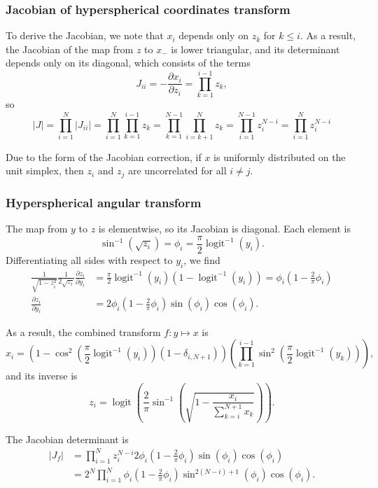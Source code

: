 \begin{appendices}
\subsubsection{Jacobian of hyperspherical coordinates transform}

To derive the Jacobian, we note that $x_i$ depends only on $z_k$ for $k \le i$.
As a result, the Jacobian of the map from $z$ to $x_-$ is lower triangular, and its determinant depends only on its diagonal, which consists of the terms
$$J_{ii} = -\frac{\partial x_i}{\partial z_i} = \prod_{k=1}^{i-1} z_k,$$
so
$$
|J| = \prod_{i=1}^N |J_{ii}|
= \prod_{i=1}^N \prod_{k=1}^{i-1} z_k
= \prod_{k=1}^{N-1} \prod_{i=k+1}^N z_k
= \prod_{i=1}^{N-1} z_i^{N-i} = \prod_{i=1}^N z_i^{N-i}
$$

Due to the form of the Jacobian correction, if $x$ is uniformly distributed on the unit simplex, then $z_i$ and $z_j$ are uncorrelated for all $i \ne j$.

\subsubsection{Hyperspherical angular transform}

The map from $y$ to $z$ is elementwise, so its Jacobian is diagonal.
Each element is
$$\sin^{-1}(\sqrt{z_i}) = \phi_i = \frac{\pi}{2} \operatorname{logit}^{-1} (y_i).$$
Differentiating all sides with respect to $y_i$, we find
$$
\begin{aligned}
\frac{1}{\sqrt{1 - z_i^2}} \frac{1}{2 \sqrt{z_i}} \frac{\partial z_i}{\partial y_i} &= \frac{\pi}{2} \operatorname{logit}^{-1} (y_i) (1 - \operatorname{logit}^{-1} (y_i)) = \phi_i \left(1 - \frac{2}{\pi} \phi_i\right)\\
\frac{\partial z_i}{\partial y_i} &= 2 \phi_i \left(1 - \frac{2}{\pi} \phi_i\right) \sin(\phi_i) \cos(\phi_i).
\end{aligned}
$$

As a result, the combined transform $f: y \mapsto x$ is
\[
  x_i = \left(1 - \cos^2\left(\frac{\pi}{2} \operatorname{logit}^{-1} (y_i)\right) (1 - \delta_{i,N+1})\right)\left(\prod_{k=1}^{i-1} \sin^2\left(\frac{\pi}{2} \operatorname{logit}^{-1} (y_k)\right)\right),
\]
and its inverse is
\[
z_i = \operatorname{logit}\left(\frac{2}{\pi}\sin^{-1}\left(\sqrt{1 - \frac{x_i}{\sum_{k=i}^{N+1} x_k}}\right)\right).
\]

The Jacobian determinant is
$$
\begin{aligned}
    |J_f| &= \prod_{i=1}^N z_i^{N-i} 2 \phi_i \left(1 - \frac{2}{\pi} \phi_i\right) \sin(\phi_i) \cos(\phi_i)\\
          &= 2^N \prod_{i=1}^N \phi_i \left(1 - \frac{2}{\pi} \phi_i\right) \sin^{2(N-i)+1}(\phi_i) \cos(\phi_i).
\end{aligned}
$$


\end{appendices}
